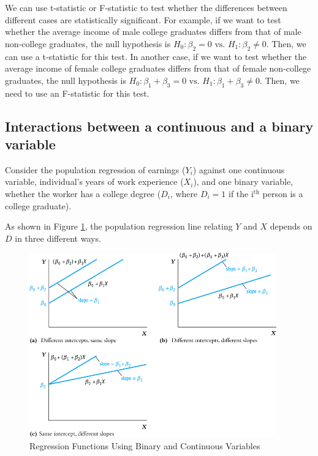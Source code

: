 \documentclass[a4paper,11pt]{article}
\begin{document}
\begin{itemize}
We can use t-statistic or F-statistic to test whether the differences
between different cases are statistically significant. For example, if
we want to test whether the average income of male college graduates
differs from that of male non-college graduates, the null hypothesis
is \(H_0: \beta_2 = 0 \text{ vs. } H_1: \beta_2 \neq 0\). Then, we can
use a t-statistic for this test. In another case, if we want to test
whether the average income of female college graduates differs from that
of female non-college graduates, the null hypothesis is \(H_0:
\beta_1 + \beta_3 = 0 \text{ vs. } H_1: \beta_1 + \beta_3 \neq
0\). Then, we need to use an F-statistic for this test.
\end{itemize}


\subsection{Interactions between a continuous and a binary variable}
\label{sec:org9ce99fe}
Consider the population regression of earnings (\(Y_i\)) against one
continuous variable, individual's years of work experience (\(X_i\)),
and one binary variable, whether the worker has a college degree
(\(D_i\), where \(D_i=1\) if the i\(^{\text{th}}\) person is a college graduate).

As shown in Figure \ref{fig:org6a9773e}, the population regression line relating \(Y\) and
\(X\) depends on \(D\) in three different ways.

\begin{figure}[htbp]
\centering
\includegraphics[width=0.95\textwidth]{img/fig-8-8.png}
\caption{\label{fig:org6a9773e}
Regression Functions Using Binary and Continuous Variables}
\end{figure}
\end{document}
